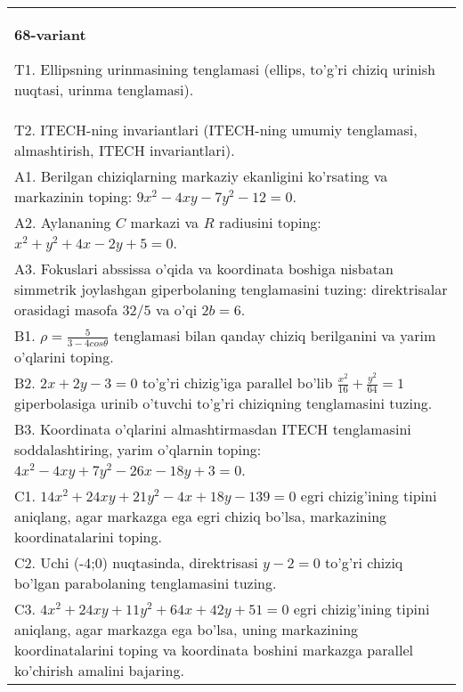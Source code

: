 \documentclass{article}
\begin{document}
\begin{tabular}{m{17cm}}
\textbf{68-variant}
\newline

T1. Ellipsning urinmasining tenglamasi (ellips, to'g'ri chiziq urinish nuqtasi, urinma tenglamasi).\\

T2. ITECH-ning invariantlari (ITECH-ning umumiy tenglamasi, almashtirish, ITECH invariantlari).\\

A1. Berilgan chiziqlarning markaziy ekanligini ko'rsating va markazinin toping: $9x^{2}-4xy-7y^{2}-12=0$.\\

A2. Aylananing $C$ markazi va $R$ radiusini toping: $x^2+y^2+4x-2y+5=0$.\\

A3. Fokuslari abssissa o'qida va koordinata boshiga nisbatan simmetrik joylashgan giperbolaning tenglamasini tuzing: direktrisalar orasidagi masofa $32/5$ va o'qi $2b=6$.\\

B1. $\rho = \frac{5}{3 - 4cos\theta}$ tenglamasi bilan qanday chiziq berilganini va yarim o'qlarini toping.  \\

B2. $2x + 2y - 3 = 0$ to'g'ri chizig'iga parallel bo'lib $\frac{x^{2}}{16} + \frac{y^{2}}{64} = 1$ giperbolasiga urinib o'tuvchi to'g'ri chiziqning tenglamasini tuzing.  \\

B3. Koordinata o'qlarini almashtirmasdan ITECH tenglamasini soddalashtiring, yarim o'qlarnin toping: $4x^{2} - 4xy + 7y^{2} - 26x - 18y + 3 = 0$.\\

C1. $14x^{2} + 24xy + 21y^{2} - 4x + 18y - 139 = 0$ egri chizig'ining tipini aniqlang, agar markazga ega egri chiziq bo'lsa, markazining koordinatalarini toping.  \\

C2. Uchi (-4;0) nuqtasinda, direktrisasi $y - 2 = 0$ to'g'ri chiziq bo'lgan parabolaning tenglamasini tuzing.\\

C3. $4x^{2} + 24xy + 11y^{2} + 64x + 42y + 51 = 0$ egri chizig'ining tipini aniqlang, agar markazga ega bo'lsa, uning markazining koordinatalarini toping va koordinata boshini markazga parallel ko'chirish amalini bajaring.\\

\end{tabular}
\vspace{1cm}
\end{document}
